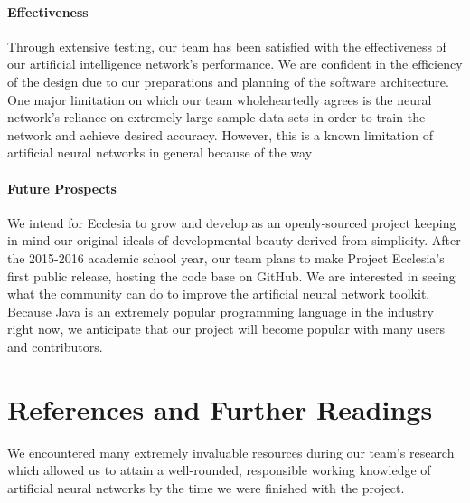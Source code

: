 \documentclass[letterpaper, 10pt]{article}
\begin{document}
	\paragraph{Effectiveness}
	Through extensive testing, our team has been satisfied with the effectiveness of our artificial intelligence network's performance. We are confident in the efficiency of the design due to our preparations and planning of the software architecture. One major limitation on which our team wholeheartedly agrees is the neural network's reliance on extremely large sample data sets in order to train the network and achieve desired accuracy. However, this is a known limitation of artificial neural networks in general because of the way
	
	\paragraph{Future Prospects}
	We intend for Ecclesia to grow and develop as an openly-sourced project keeping in mind our original ideals of developmental beauty derived from simplicity. After the 2015-2016 academic school year, our team plans to make Project Ecclesia's first public release, hosting the code base on GitHub. We are interested in seeing what the community can do to improve the artificial neural network toolkit. Because Java is an extremely popular programming language in the industry right now, we anticipate that our project will become popular with many users and contributors.


\cleardoublepage
\section{References and Further Readings}
	We encountered many extremely invaluable resources during our team's research which allowed us to attain a well-rounded, responsible working knowledge of artificial neural networks by the time we were finished with the project.

	\large
	\vspace{0.65cm}
\end{document}
